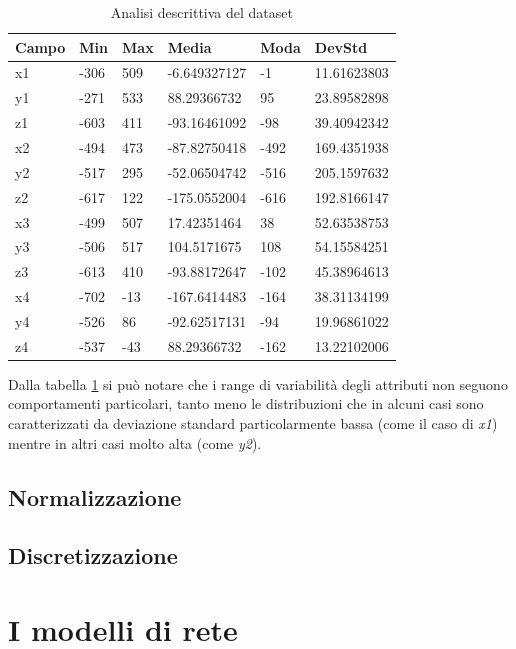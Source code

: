 \documentclass[12pt]{article}
\begin{document}
\begin{table}[h]
	\caption{Analisi descrittiva del dataset}\label{tab:analytics}
	\begin{tabular}{|l|l|l|l|l|l|}
		\hline
		Campo & Min & Max & Media & Moda & DevStd \\
		\hline
		x1 & -306 & 509 & -6.649327127 & -1 & 11.61623803 \\
		y1 & -271 & 533 & 88.29366732 & 95 & 23.89582898 \\
		z1 & -603 & 411 & -93.16461092 & -98 & 39.40942342 \\
		x2 & -494 & 473 & -87.82750418 & -492 & 169.4351938 \\
		y2 & -517 & 295 & -52.06504742 & -516 & 205.1597632 \\
		z2 & -617 & 122 & -175.0552004 & -616 & 192.8166147 \\
		x3 & -499 & 507 & 17.42351464 & 38 & 52.63538753 \\
		y3 & -506 & 517 & 104.5171675 & 108 & 54.15584251 \\
		z3 & -613 & 410 & -93.88172647 & -102 & 45.38964613 \\
		x4 & -702 & -13 & -167.6414483 & -164 & 38.31134199 \\
		y4 & -526 & 86 & -92.62517131 & -94 & 19.96861022 \\
		z4 & -537 & -43 & 88.29366732 & -162 & 13.22102006 \\
		
		\hline
	\end{tabular}
\end{table}

Dalla tabella \ref{tab:analytics} si può notare che i range di variabilità degli attributi non seguono comportamenti particolari, tanto meno le distribuzioni che in alcuni casi sono caratterizzati da deviazione standard particolarmente bassa (come il caso di \emph{x1}) mentre in altri casi molto alta (come \emph{y2}).

\subsection{Normalizzazione}
\subsection{Discretizzazione}

\section{I modelli di rete}
\end{document}
